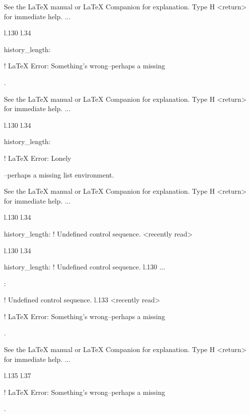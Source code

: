 {{{{{{See the LaTeX manual or LaTeX Companion for explanation.
Type  H <return>  for immediate help.
 ...                                              
                                                  
l.130 l.34     \item \xmlNode
                             {history\_length}: \xmlDesc

! LaTeX Error: Something's wrong--perhaps a missing \item.

See the LaTeX manual or LaTeX Companion for explanation.
Type  H <return>  for immediate help.
 ...                                              
                                                  
l.130 l.34     \item \xmlNode
                             {history\_length}: \xmlDesc

! LaTeX Error: Lonely \item--perhaps a missing list environment.

See the LaTeX manual or LaTeX Companion for explanation.
Type  H <return>  for immediate help.
 ...                                              
                                                  
l.130 l.34     \item \xmlNode
                             {history\_length}: \xmlDesc
! Undefined control sequence.
<recently read> \xmlNode 
                         
l.130 l.34     \item \xmlNode
                             {history\_length}: \xmlDesc
! Undefined control sequence.
l.130 ...\item {}: \xmlDesc
                                                  
! Undefined control sequence.
l.133 <recently read> \xmlNode
                              

! LaTeX Error: Something's wrong--perhaps a missing \item.

See the LaTeX manual or LaTeX Companion for explanation.
Type  H <return>  for immediate help.
 ...                                              
                                                  
l.135 l.37     \item \xmlNode
                             

! LaTeX Error: Something's wrong--perhaps a missing \item.

}}}}}}
